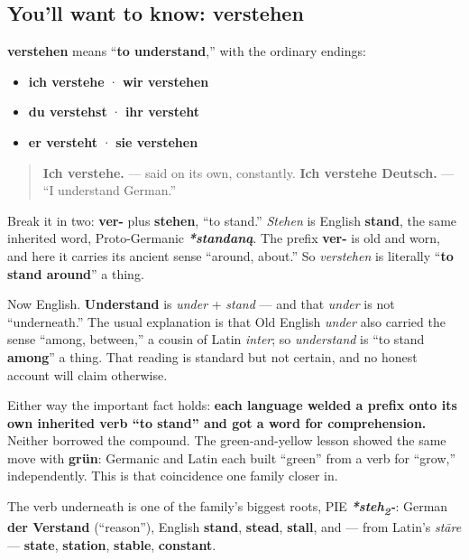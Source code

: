 \subsection*{You'll want to know: verstehen}
\textbf{verstehen} means \textquotedblleft{}\textbf{to understand},\textquotedblright{} with the ordinary endings:

\begin{itemize}
\raggedright
  \item \textbf{ich verstehe} · \textbf{wir verstehen}
  \item \textbf{du verstehst} · \textbf{ihr versteht}
  \item \textbf{er versteht} · \textbf{sie verstehen}
\end{itemize}

\begin{quote}
\textbf{Ich verstehe.} — said on its own, constantly. \textbf{Ich verstehe Deutsch.} — \textquotedblleft{}I understand German.\textquotedblright{}
\end{quote}

\begin{cousinweb}
Break it in two: \textbf{ver-} plus \textbf{stehen}, \textquotedblleft{}to stand.\textquotedblright{} \emph{Stehen} is English \textbf{stand}, the same inherited word, Proto-Germanic \emph{\textbf{*standaną}}. The prefix \textbf{ver-} is old and worn, and here it carries its ancient sense \textquotedblleft{}around, about.\textquotedblright{} So \emph{verstehen} is literally \textquotedblleft{}\textbf{to stand around}\textquotedblright{} a thing.

Now English. \textbf{Understand} is \emph{under} + \emph{stand} — and that \emph{under} is not \textquotedblleft{}underneath.\textquotedblright{} The usual explanation is that Old English \emph{under} also carried the sense \textquotedblleft{}among, between,\textquotedblright{} a cousin of Latin \emph{inter}; so \emph{understand} is \textquotedblleft{}to stand \textbf{among}\textquotedblright{} a thing. That reading is standard but not certain, and no honest account will claim otherwise.

Either way the important fact holds: \textbf{each language welded a prefix onto its own inherited verb \textquotedblleft{}to stand\textquotedblright{} and got a word for comprehension.} Neither borrowed the compound. The green-and-yellow lesson showed the same move with \textbf{grün}: Germanic and Latin each built \textquotedblleft{}green\textquotedblright{} from a verb for \textquotedblleft{}grow,\textquotedblright{} independently. This is that coincidence one family closer in.

The verb underneath is one of the family's biggest roots, PIE \emph{\textbf{*steh\textsubscript{2}-}}: German \textbf{der Verstand} (\textquotedblleft{}reason\textquotedblright{}), English \textbf{stand}, \textbf{stead}, \textbf{stall}, and — from Latin's \emph{stāre} — \textbf{state}, \textbf{station}, \textbf{stable}, \textbf{constant}.
\end{cousinweb}

